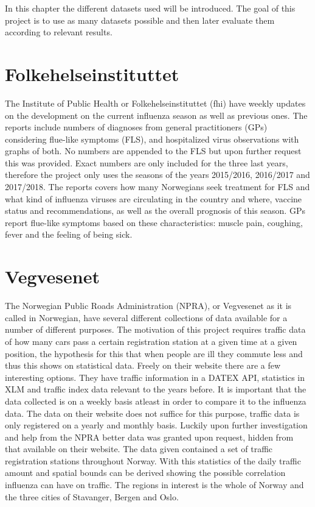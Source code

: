 In this chapter the different datasets used will be introduced. The goal of this project is to use as many datasets possible and then later evaluate them according to relevant results.

\section{Folkehelseinstituttet}
The Institute of Public Health or Folkehelseinstituttet (fhi) have weekly updates\cite{fhi} on the development on the current influenza season as well as previous ones. The reports include numbers of diagnoses from general practitioners (GPs) considering flue-like symptoms (FLS), and hospitalized virus observations with graphs of both. No numbers are appended to the FLS but upon further request this was provided. Exact numbers are only included for the three last years, therefore the project only uses the seasons of the years 2015/2016, 2016/2017 and 2017/2018. The reports covers how many Norwegians seek treatment for FLS and what kind of influenza viruses are circulating in the country and where, vaccine status and recommendations, as well as the overall prognosis of this season. GPs report flue-like symptoms based on these characteristics: muscle pain, coughing, fever and the feeling of being sick.

\section{Vegvesenet}
The Norwegian Public Roads Administration (NPRA), or Vegvesenet as it is called in Norwegian, have several different collections of data available for a number of different purposes. The motivation of this project requires traffic data of how many cars pass a certain registration station at a given time at a given position, the hypothesis for this that when people are ill they commute less and thus this shows on statistical data. Freely on their website \cite{vegvesenet} there are a few interesting options. They have traffic information in a DATEX API, statistics in XLM and traffic index data relevant to the years before. It is important that the data collected is on a weekly basis atleast in order to compare it to the influenza data. The data on their website does not suffice for this purpose, traffic data is only registered on a yearly and monthly basis. Luckily upon further investigation and help from the NPRA better data was granted upon request, hidden from that available on their website. The data given contained a set of traffic registration stations throughout Norway. With this statistics of the daily traffic amount and spatial bounds can be derived showing the possible correlation influenza can have on traffic. The regions in interest is the whole of Norway and the three cities of Stavanger, Bergen and Oslo.

